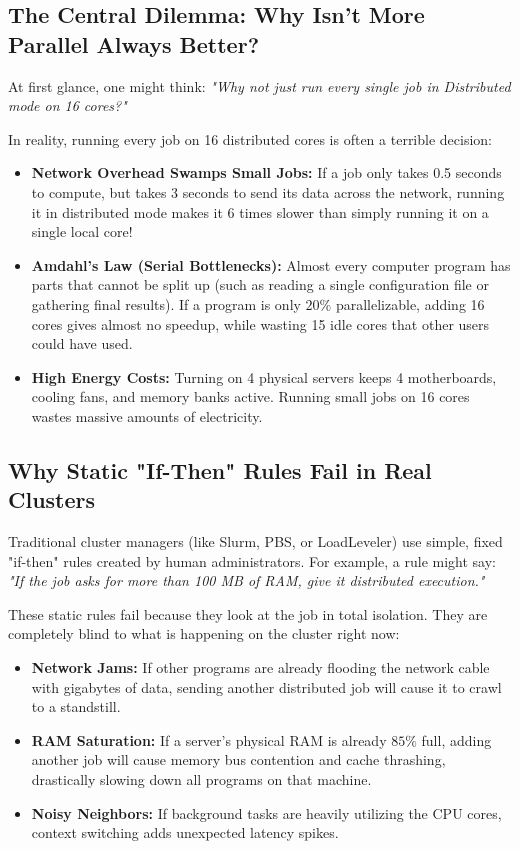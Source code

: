 \documentclass[11pt,a4paper]{article}
\begin{document}
\subsection{The Central Dilemma: Why Isn't More Parallel Always Better?}
At first glance, one might think: \textit{"Why not just run every single job in Distributed mode on 16 cores?"} 

In reality, running every job on 16 distributed cores is often a terrible decision:
\begin{itemize}[noitemsep, topsep=2pt]
    \item \textbf{Network Overhead Swamps Small Jobs:} If a job only takes 0.5 seconds to compute, but takes 3 seconds to send its data across the network, running it in distributed mode makes it 6 times slower than simply running it on a single local core!
    \item \textbf{Amdahl's Law (Serial Bottlenecks):} Almost every computer program has parts that cannot be split up (such as reading a single configuration file or gathering final results). If a program is only $20\%$ parallelizable, adding 16 cores gives almost no speedup, while wasting 15 idle cores that other users could have used.
    \item \textbf{High Energy Costs:} Turning on 4 physical servers keeps 4 motherboards, cooling fans, and memory banks active. Running small jobs on 16 cores wastes massive amounts of electricity.
\end{itemize}

\subsection{Why Static "If-Then" Rules Fail in Real Clusters}
Traditional cluster managers (like Slurm, PBS, or LoadLeveler) use simple, fixed "if-then" rules created by human administrators. For example, a rule might say: \textit{"If the job asks for more than 100 MB of RAM, give it distributed execution."}

These static rules fail because they look at the job in total isolation. They are completely blind to what is happening on the cluster right now:
\begin{itemize}[noitemsep, topsep=1pt]
    \item \textbf{Network Jams:} If other programs are already flooding the network cable with gigabytes of data, sending another distributed job will cause it to crawl to a standstill.
    \item \textbf{RAM Saturation:} If a server's physical RAM is already $85\%$ full, adding another job will cause memory bus contention and cache thrashing, drastically slowing down all programs on that machine.
    \item \textbf{Noisy Neighbors:} If background tasks are heavily utilizing the CPU cores, context switching adds unexpected latency spikes.
\end{itemize}
\end{document}

